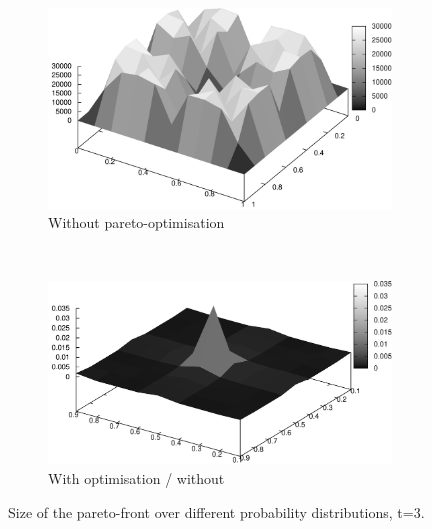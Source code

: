 \documentclass{article}
\begin{document}
\begin{figure}
		\begin{subfigure}[b]{0.45\textwidth}
			\centering
			\includegraphics[width=\textwidth]{images/r3_nopareto}
			\caption{Without pareto-optimisation}
			\label{fig:r3_nopareto}
		\end{subfigure}
		~
		\begin{subfigure}[b]{0.45\textwidth}
			\centering
			\includegraphics[width=\textwidth]{images/r3_divided}
			\caption{With optimisation / without}
			\label{fig:r3_divided}
		\end{subfigure}
		\caption{Size of the pareto-front over different probability
		distributions, t=3.}
		\label{fig:3d_size}
	\end{figure}
\end{document}

